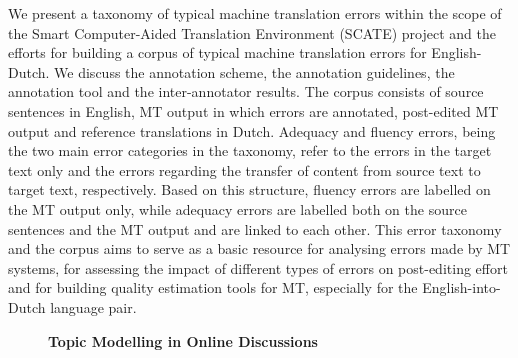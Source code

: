 \documentclass[10pt, a4paper, twopage, headinclude, footinclude, BCOR5mm]{scrartcl}
\begin{document}
\noindent
We present a taxonomy of typical machine translation errors within the scope of the Smart Computer-Aided Translation Environment (SCATE) project and the efforts for building a corpus of typical machine translation errors for English-Dutch.  We discuss the annotation scheme, the annotation guidelines, the annotation tool and the inter-annotator results.   The corpus consists of source sentences in English, MT output in which errors are annotated, post-edited MT output and reference translations in Dutch. Adequacy and fluency errors, being the two main error categories in the taxonomy, refer to the errors in the target text only and the errors regarding the transfer of content from source text to target text, respectively. Based on this structure, fluency errors are labelled on the MT output only, while adequacy errors are labelled both on the source sentences and the MT output and are linked to each other.   This error taxonomy and the corpus aims to serve as a basic resource for analysing errors made by MT systems, for assessing the impact of different types of errors on post-editing effort and for building quality estimation tools for MT, especially for the English-into-Dutch language pair. 


\newpage

\begin{figure}[t!]
\centering
\large\textbf{Topic Modelling in Online Discussions}
\vspace*{0.5cm}
\end{figure}


        \begin{table}[t!]
    \end{table}
\end{document}
